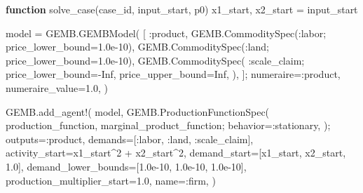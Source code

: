 \documentclass[
  letterpaper,
  DIV=11,
  numbers=noendperiod]{scrreprt}
\newenvironment{Shaded}{\begin{snugshade}}{\end{snugshade}}
\newcommand{\ConstantTok}[1]{\textcolor[rgb]{0.56,0.35,0.01}{#1}}
\newcommand{\FloatTok}[1]{\textcolor[rgb]{0.68,0.00,0.00}{#1}}
\newcommand{\FunctionTok}[1]{\textcolor[rgb]{0.28,0.35,0.67}{#1}}
\newcommand{\KeywordTok}[1]{\textcolor[rgb]{0.00,0.23,0.31}{\textbf{#1}}}
\newcommand{\NormalTok}[1]{\textcolor[rgb]{0.00,0.23,0.31}{#1}}
\newcommand{\OperatorTok}[1]{\textcolor[rgb]{0.37,0.37,0.37}{#1}}
\begin{document}
\begin{codelisting}
{\begin{Shaded}
\begin{Highlighting}[]
\KeywordTok{function} \FunctionTok{solve\_case}\NormalTok{(case\_id, input\_start, p0)}
\NormalTok{    x1\_start, x2\_start }\OperatorTok{=}\NormalTok{ input\_start}

\NormalTok{    model }\OperatorTok{=}\NormalTok{ GEMB.}\FunctionTok{GEMBModel}\NormalTok{(}
\NormalTok{        [}
            \OperatorTok{:}\NormalTok{product,}
\NormalTok{            GEMB.}\FunctionTok{CommoditySpec}\NormalTok{(}\OperatorTok{:}\NormalTok{labor; price\_lower\_bound}\OperatorTok{=}\FloatTok{1.0e{-}10}\NormalTok{),}
\NormalTok{            GEMB.}\FunctionTok{CommoditySpec}\NormalTok{(}\OperatorTok{:}\NormalTok{land; price\_lower\_bound}\OperatorTok{=}\FloatTok{1.0e{-}10}\NormalTok{),}
\NormalTok{            GEMB.}\FunctionTok{CommoditySpec}\NormalTok{(}
                \OperatorTok{:}\NormalTok{scale\_claim;}
\NormalTok{                price\_lower\_bound}\OperatorTok{={-}}\ConstantTok{Inf}\NormalTok{,}
\NormalTok{                price\_upper\_bound}\OperatorTok{=}\ConstantTok{Inf}\NormalTok{,}
\NormalTok{            ),}
\NormalTok{        ];}
\NormalTok{        numeraire}\OperatorTok{=:}\NormalTok{product,}
\NormalTok{        numeraire\_value}\OperatorTok{=}\FloatTok{1.0}\NormalTok{,}
\NormalTok{    )}

\NormalTok{    GEMB.}\FunctionTok{add\_agent!}\NormalTok{(}
\NormalTok{        model,}
\NormalTok{        GEMB.}\FunctionTok{ProductionFunctionSpec}\NormalTok{(}
\NormalTok{            production\_function,}
\NormalTok{            marginal\_product\_function;}
\NormalTok{            behavior}\OperatorTok{=:}\NormalTok{stationary,}
\NormalTok{        );}
\NormalTok{        outputs}\OperatorTok{=:}\NormalTok{product,}
\NormalTok{        demands}\OperatorTok{=}\NormalTok{[}\OperatorTok{:}\NormalTok{labor, }\OperatorTok{:}\NormalTok{land, }\OperatorTok{:}\NormalTok{scale\_claim],}
\NormalTok{        activity\_start}\OperatorTok{=}\NormalTok{x1\_start}\OperatorTok{\^{}}\FloatTok{2} \OperatorTok{+}\NormalTok{ x2\_start}\OperatorTok{\^{}}\FloatTok{2}\NormalTok{,}
\NormalTok{        demand\_start}\OperatorTok{=}\NormalTok{[x1\_start, x2\_start, }\FloatTok{1.0}\NormalTok{],}
\NormalTok{        demand\_lower\_bounds}\OperatorTok{=}\NormalTok{[}\FloatTok{1.0e{-}10}\NormalTok{, }\FloatTok{1.0e{-}10}\NormalTok{, }\FloatTok{1.0e{-}10}\NormalTok{],}
\NormalTok{        production\_multiplier\_start}\OperatorTok{=}\FloatTok{1.0}\NormalTok{,}
\NormalTok{        name}\OperatorTok{=:}\NormalTok{firm,}
\NormalTok{    )}


\end{Highlighting}
\end{Shaded}}
\end{codelisting}
\end{document}
